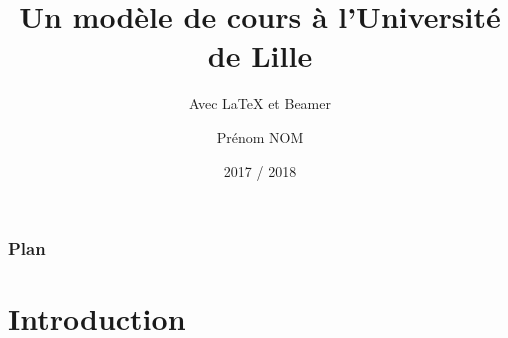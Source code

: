 \documentclass[10pt,t]{beamer}
\title{Un modèle de cours à l'Université de Lille}
\subtitle{Avec \LaTeX{} et Beamer}
\author{Prénom NOM}
\institute{Université de Lille}
\date{2017 / 2018}
\begin{document}
\maketitle[label=titre]

\begin{frame}
  \frametitle{Plan}
  \tableofcontents %
\end{frame}


\section*{Introduction}

\end{document}
